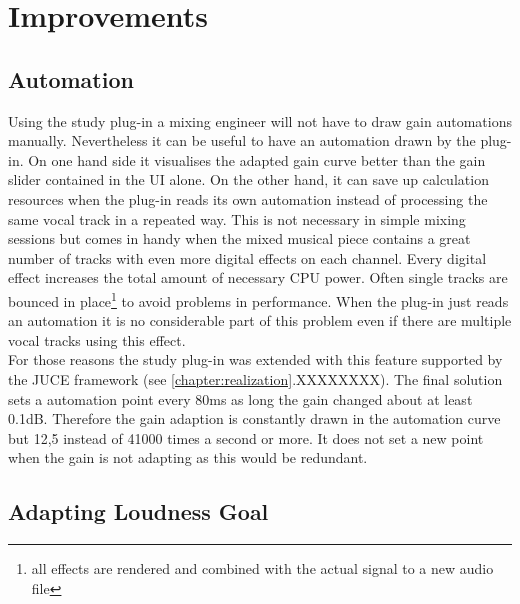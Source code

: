 \chapter{Improvements}
\label{chapter:improvements}

\section{Automation}

Using the study plug-in a mixing engineer will not have to draw gain automations manually. Nevertheless it can be useful to have an automation drawn by the plug-in. On one hand side it visualises the adapted gain curve better than the gain slider contained in the UI alone. On the other hand, it can save up calculation resources when the plug-in reads its own automation instead of processing the same vocal track in a repeated way. This is not necessary in simple mixing sessions but comes in handy when the mixed musical piece contains a great number of tracks with even more digital effects on each channel. Every digital effect increases the total amount of necessary CPU power. Often single tracks are bounced in place\footnote{all effects are rendered and combined with the actual signal to a new audio file} to avoid problems in performance. When the plug-in just reads an automation it is no considerable part of this problem even if there are multiple vocal tracks using this effect.\\
For those reasons the study plug-in was extended with this feature supported by the JUCE framework (see \ref{chapter:realization}.XXXXXXXX).
The final solution sets a automation point every 80ms as long the gain changed about at least 0.1dB. Therefore the gain adaption is constantly drawn in the automation curve but 12,5 instead of 41000 times a second or more. It does not set a new point when the gain is not adapting as this would be redundant.\\

\section{Adapting Loudness Goal}

